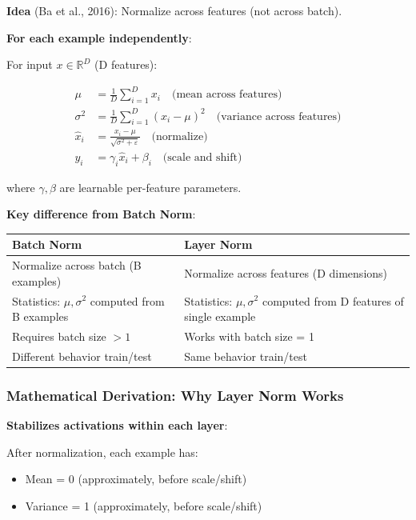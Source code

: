 \textbf{Idea} (Ba et al., 2016): Normalize across features (not across batch).

\textbf{For each example independently}:

For input $x \in \mathbb{R}^D$ (D features):

\begin{align*}
\mu &= \frac{1}{D} \sum_{i=1}^D x_i \quad \text{(mean across features)} \\
\sigma^2 &= \frac{1}{D} \sum_{i=1}^D (x_i - \mu)^2 \quad \text{(variance across features)} \\
\hat{x}_i &= \frac{x_i - \mu}{\sqrt{\sigma^2 + \varepsilon}} \quad \text{(normalize)} \\
y_i &= \gamma_i \hat{x}_i + \beta_i \quad \text{(scale and shift)}
\end{align*}

where $\gamma, \beta$ are learnable per-feature parameters.

\textbf{Key difference from Batch Norm}:

\begin{center}
\begin{tabular}{ll}
\hline
\textbf{Batch Norm} & \textbf{Layer Norm} \\
\hline
Normalize across batch (B examples) & Normalize across features (D dimensions) \\
Statistics: $\mu, \sigma^2$ computed from B examples & Statistics: $\mu, \sigma^2$ computed from D features of single example \\
Requires batch size $> 1$ & Works with batch size = 1 \\
Different behavior train/test & Same behavior train/test \\
\hline
\end{tabular}
\end{center}

\subsubsection{Mathematical Derivation: Why Layer Norm Works}

\textbf{Stabilizes activations within each layer}:

After normalization, each example has:
\begin{itemize}
\item Mean = 0 (approximately, before scale/shift)
\item Variance = 1 (approximately, before scale/shift)
\end{itemize}

